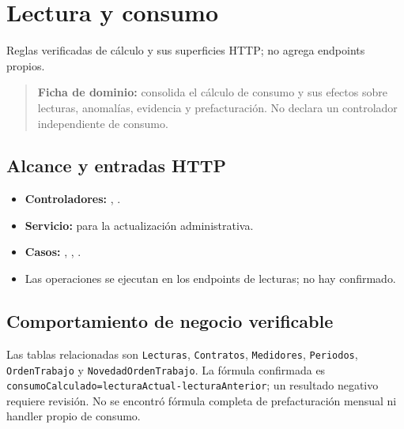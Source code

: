 \section{Lectura y consumo}


Reglas verificadas de cálculo y sus superficies HTTP; no agrega endpoints propios.


\begin{quote}
\textbf{Ficha de dominio:} consolida el cálculo de consumo y sus efectos sobre lecturas, anomalías, evidencia y prefacturación. No declara un controlador independiente de consumo.
\end{quote}


\subsection{Alcance y entradas HTTP}


\begin{itemize}
\item \textbf{Controladores:} \texttt{}, \texttt{}.
\item \textbf{Servicio:} \texttt{} para la actualización administrativa.
\item \textbf{Casos:} \texttt{}, \texttt{}, \texttt{}.
\item Las operaciones se ejecutan en los endpoints de lecturas; no hay \texttt{} confirmado.
\end{itemize}

\subsection{Comportamiento de negocio verificable}
Las tablas relacionadas son \texttt{Lecturas}, \texttt{Contratos}, \texttt{Medidores}, \texttt{Periodos}, \texttt{OrdenTrabajo} y \texttt{NovedadOrdenTrabajo}. La fórmula confirmada es \texttt{consumoCalculado=lecturaActual-lecturaAnterior}; un resultado negativo requiere revisión. No se encontró fórmula completa de prefacturación mensual ni handler propio de consumo.


